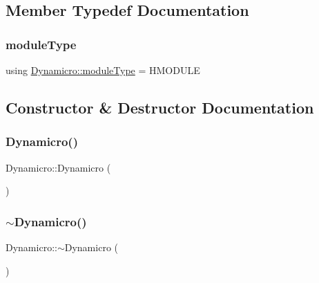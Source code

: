 \subsection{Member Typedef Documentation}
\mbox{\label{class_dynamicro_a8476681e7880be183a320960f3373a47}} 
\subsubsection{\texorpdfstring{moduleType}{moduleType}}
{\footnotesize\ttfamily using \mbox{\hyperlink{class_dynamicro_a8476681e7880be183a320960f3373a47}{Dynamicro\+::module\+Type}} =  H\+M\+O\+D\+U\+LE\hspace{0.3cm}{\ttfamily [private]}}



\subsection{Constructor \& Destructor Documentation}
\mbox{\label{class_dynamicro_adc18806affe30aa2de02503621956a76}} 
\subsubsection{\texorpdfstring{Dynamicro()}{Dynamicro()}}
{\footnotesize\ttfamily Dynamicro\+::\+Dynamicro (\begin{DoxyParamCaption}{ }\end{DoxyParamCaption})\hspace{0.3cm}{\ttfamily [inline]}}

\mbox{\label{class_dynamicro_aaf074dfe2316bbee5f46db362792368b}} 
\subsubsection{\texorpdfstring{$\sim$Dynamicro()}{~Dynamicro()}}
{\footnotesize\ttfamily Dynamicro\+::$\sim$\+Dynamicro (\begin{DoxyParamCaption}{ }\end{DoxyParamCaption})\hspace{0.3cm}{\ttfamily [inline]}}



